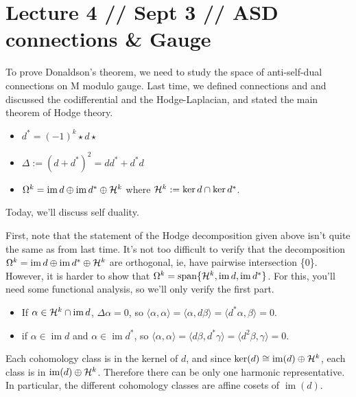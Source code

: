 \documentclass[main]{subfiles}
\begin{document}
\section*{Lecture 4 // Sept 3 // ASD connections \& Gauge}

\begin{recall}
To prove Donaldson's theorem, we need to study the space of anti-self-dual connections on M modulo gauge. Last time, we defined connections and and discussed the codifferential and the Hodge-Laplacian, and stated the main theorem of Hodge theory.
\begin{itemize}
	\item $d^\ast = (-1)^k \star d \star$ 
	\item $\Delta := (d+d^\ast)^2 = dd^\ast + d^\ast d$ 
	\item $\Omega^k = \operatorname{im} d \oplus \operatorname{im} d^\ast \oplus \mathcal{H}^k$
		where $\mathcal{H}^k := \operatorname{ker} d \cap \operatorname{ker} d^\ast$.
\end{itemize}
	Today, we'll discuss self duality.
\end{recall}

First, note that the statement of the Hodge decomposition given above isn't quite the same as from last time. It's not too difficult to verify that the decomposition $\Omega^k = \operatorname{im} d \oplus \operatorname{im} d^\ast \oplus \mathcal{H}^k$ are orthogonal, ie, have pairwise intersection \{0\}.
However, it is harder to show that $\Omega^k = \operatorname{span}\{\mathcal{H}^k, \operatorname{im} d, \operatorname{im} d^\ast\}$. For this, you'll need some functional analysis, so we'll only verify the first part. 

\begin{itemize}
	\item If $\alpha\in\mathcal{H}^k\cap\operatorname{im} d$, $\Delta \alpha = 0$, so $	\langle \alpha,\alpha\rangle = \langle \alpha, d\beta\rangle = \langle d^\ast \alpha, \beta\rangle = 0$. 
	\item if $\alpha \in \operatorname{im} d$ and $\alpha \in \operatorname{im} d^\ast$, so $	\langle \alpha,\alpha\rangle = \langle d\beta, d^\ast \gamma\rangle = \langle d^2\beta,\gamma\rangle = 0$.
\end{itemize}

Each cohomology class is in the kernel of $d$, and since $\operatorname{ker}(d) \cong \operatorname{im}(d) \oplus \mathcal{H}^k$, each class is in $\operatorname{im}(d) \oplus \mathcal{H}^k$. Therefore there can be only one harmonic representative. 
In particular, the different cohomology classes are affine cosets of $\operatorname{im}(d)$.
\end{document}
